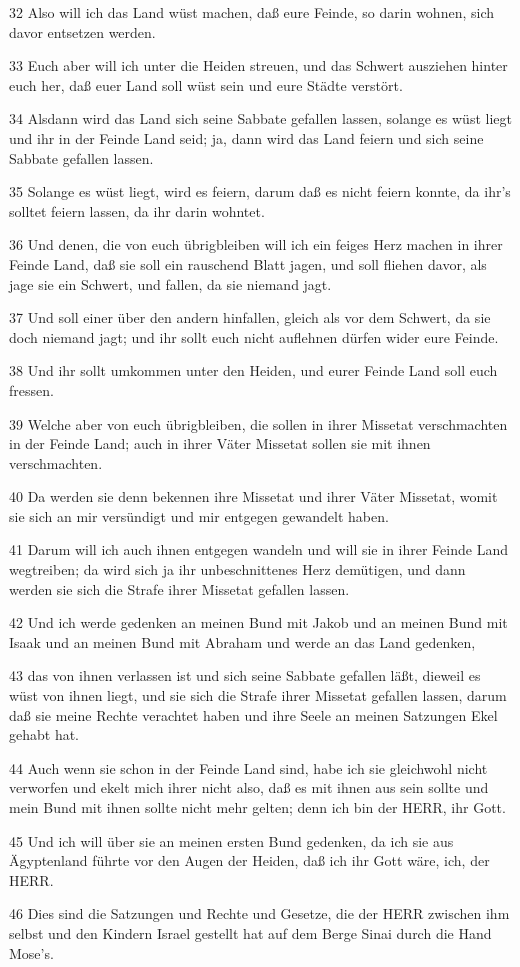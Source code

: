 \par 32 Also will ich das Land wüst machen, daß eure Feinde, so darin wohnen, sich davor entsetzen werden.
\par 33 Euch aber will ich unter die Heiden streuen, und das Schwert ausziehen hinter euch her, daß euer Land soll wüst sein und eure Städte verstört.
\par 34 Alsdann wird das Land sich seine Sabbate gefallen lassen, solange es wüst liegt und ihr in der Feinde Land seid; ja, dann wird das Land feiern und sich seine Sabbate gefallen lassen.
\par 35 Solange es wüst liegt, wird es feiern, darum daß es nicht feiern konnte, da ihr's solltet feiern lassen, da ihr darin wohntet.
\par 36 Und denen, die von euch übrigbleiben will ich ein feiges Herz machen in ihrer Feinde Land, daß sie soll ein rauschend Blatt jagen, und soll fliehen davor, als jage sie ein Schwert, und fallen, da sie niemand jagt.
\par 37 Und soll einer über den andern hinfallen, gleich als vor dem Schwert, da sie doch niemand jagt; und ihr sollt euch nicht auflehnen dürfen wider eure Feinde.
\par 38 Und ihr sollt umkommen unter den Heiden, und eurer Feinde Land soll euch fressen.
\par 39 Welche aber von euch übrigbleiben, die sollen in ihrer Missetat verschmachten in der Feinde Land; auch in ihrer Väter Missetat sollen sie mit ihnen verschmachten.
\par 40 Da werden sie denn bekennen ihre Missetat und ihrer Väter Missetat, womit sie sich an mir versündigt und mir entgegen gewandelt haben.
\par 41 Darum will ich auch ihnen entgegen wandeln und will sie in ihrer Feinde Land wegtreiben; da wird sich ja ihr unbeschnittenes Herz demütigen, und dann werden sie sich die Strafe ihrer Missetat gefallen lassen.
\par 42 Und ich werde gedenken an meinen Bund mit Jakob und an meinen Bund mit Isaak und an meinen Bund mit Abraham und werde an das Land gedenken,
\par 43 das von ihnen verlassen ist und sich seine Sabbate gefallen läßt, dieweil es wüst von ihnen liegt, und sie sich die Strafe ihrer Missetat gefallen lassen, darum daß sie meine Rechte verachtet haben und ihre Seele an meinen Satzungen Ekel gehabt hat.
\par 44 Auch wenn sie schon in der Feinde Land sind, habe ich sie gleichwohl nicht verworfen und ekelt mich ihrer nicht also, daß es mit ihnen aus sein sollte und mein Bund mit ihnen sollte nicht mehr gelten; denn ich bin der HERR, ihr Gott.
\par 45 Und ich will über sie an meinen ersten Bund gedenken, da ich sie aus Ägyptenland führte vor den Augen der Heiden, daß ich ihr Gott wäre, ich, der HERR.
\par 46 Dies sind die Satzungen und Rechte und Gesetze, die der HERR zwischen ihm selbst und den Kindern Israel gestellt hat auf dem Berge Sinai durch die Hand Mose's.

